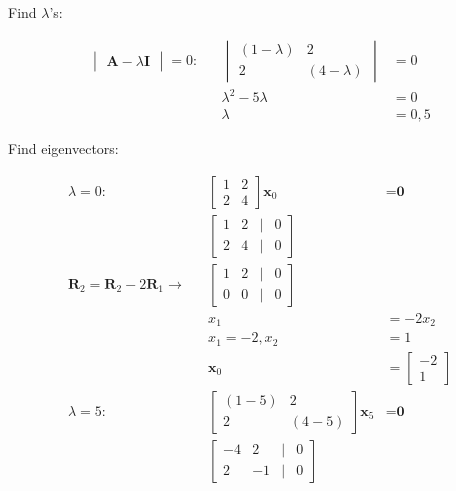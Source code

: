 \documentclass{article}
\begin{document}
Find $\lambda$'s:

\begin{align}
    \label{eq:2}
    \begin{vmatrix}
    \textbf{A} - \lambda\textbf{I}
    \end{vmatrix} = 0: && \begin{vmatrix}
    (1-\lambda) & 2\\ 2 & (4-\lambda)
    \end{vmatrix} &=0
    \\
    \label{eq:3}
    && \lambda^2-5\lambda&=0
    \\
    \label{eq:4}
    && \lambda &= 0, 5
\end{align}

Find eigenvectors:

\begin{align}
    \label{eq:5}
    \lambda = 0: && \begin{bmatrix}
    1&2\\2&4
    \end{bmatrix}\textbf{x}_0 &= \textbf{0}
    \\
    \label{eq:6}
    &&\begin{bmatrix}
    1&2 &|& 0\\
    2&4 &|& 0
    \end{bmatrix}
    \\
    \label{eq:7}
    \textbf{R}_2 = \textbf{R}_2 -2\textbf{R}_1 \rightarrow && \begin{bmatrix}
    1 & 2 &|& 0\\
    0 & 0 &|& 0
    \end{bmatrix}
    \\
    \label{eq:8}
    && x_1 &= -2x_2
    \\
    \label{eq:9}
    && x_1=-2, x_2 &= 1
    \\
    \label{eq:10}
    && \textbf{x}_0 &= \begin{bmatrix}
    -2\\1
    \end{bmatrix}
    \\
    \label{eq:11}
    \lambda = 5: && \begin{bmatrix}
    (1-5) & 2\\
    2 & (4-5)
    \end{bmatrix} \textbf{x}_5 &= \textbf{0}
    \\
    \label{eq:12}
    && \begin{bmatrix}
    -4 & 2 &|& 0\\
    2 & -1 &|& 0
    \end{bmatrix}

\end{align}
\end{document}
